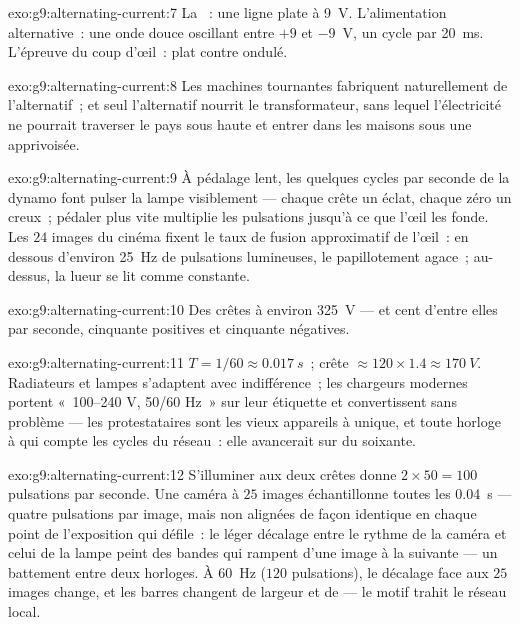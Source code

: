 \begin{solution}{exo:g9:alternating-current:7}
La ~: une ligne plate à \qty{9}{V}. L'alimentation alternative~:
une onde douce oscillant entre $+9$ et \qty{-9}{V}, un cycle par
\qty{20}{ms}. L'épreuve du coup d'œil~: plat contre ondulé.
\end{solution}

\begin{solution}{exo:g9:alternating-current:8}
Les machines tournantes fabriquent naturellement de l'alternatif~; et
seul l'alternatif nourrit le transformateur, sans lequel
l'électricité ne pourrait traverser le pays sous haute  et
entrer dans les maisons sous une  apprivoisée.
\end{solution}

\begin{solution}{exo:g9:alternating-current:9}
À pédalage lent, les quelques cycles par seconde de la dynamo font
pulser la lampe visiblement --- chaque crête un éclat, chaque zéro un
creux~; pédaler plus vite multiplie les pulsations jusqu'à ce que
l'œil les fonde. Les $24$ images du cinéma fixent le taux de fusion
approximatif de l'œil~: en dessous d'environ \qty{25}{Hz} de
pulsations lumineuses, le papillotement agace~; au-dessus, la lueur se
lit comme constante.
\end{solution}

\begin{solution}{exo:g9:alternating-current:10}
Des crêtes à environ \qty{325}{V} --- et cent d'entre elles par
seconde, cinquante positives et cinquante négatives.
\end{solution}

\begin{solution}{exo:g9:alternating-current:11}
$T = 1/60 \approx \qty{0.017}{s}$~; crête
$\approx 120 \times 1.4 \approx \qty{170}{V}$. Radiateurs et lampes
s'adaptent avec indifférence~; les chargeurs modernes portent
«~100--240 V, 50/60 Hz~» sur leur étiquette et convertissent sans
problème --- les protestataires sont les vieux appareils à 
unique, et toute horloge à  qui compte les cycles du réseau~:
elle avancerait sur du soixante.
\end{solution}

\begin{solution}{exo:g9:alternating-current:12}
S'illuminer aux deux crêtes donne $2 \times 50 = 100$ pulsations par
seconde. Une caméra à $25$ images échantillonne toutes les
\qty{0.04}{s} --- quatre pulsations par image, mais non alignées de
façon identique en chaque point de l'exposition qui défile~: le léger
décalage entre le rythme de la caméra et celui de la lampe peint des
bandes qui rampent d'une image à la suivante --- un battement entre
deux horloges. À \qty{60}{Hz} ($120$ pulsations), le décalage face aux
$25$ images change, et les barres changent de largeur et de 
--- le motif trahit le réseau local.
\end{solution}

